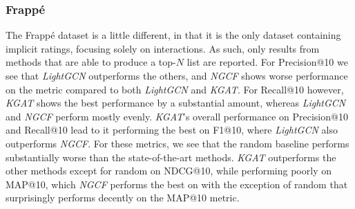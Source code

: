 \subsubsection{Frappé}
The Frappé dataset is a little different, in that it is the only dataset containing implicit ratings, focusing solely on interactions.
As such, only results from methods that are able to produce a top-$N$ list are reported.
For Precision@10 we see that \textit{LightGCN} outperforms the others, and \textit{NGCF} shows worse performance on the metric compared to both \textit{LightGCN} and \textit{KGAT}.
For Recall@10 however, \textit{KGAT} shows the best performance by a substantial amount, whereas \textit{LightGCN} and \textit{NGCF} perform mostly evenly.
\textit{KGAT}'s overall performance on Precision@10 and Recall@10 lead to it performing the best on F1@10, where \textit{LightGCN} also outperforms \textit{NGCF}.
For these metrics, we see that the random baseline performs substantially worse than the state-of-the-art methods.
\textit{KGAT} outperforms the other methods except for random on NDCG@10, while performing poorly on MAP@10, which \textit{NGCF} performs the best on with the exception of random that surprisingly performs decently on the MAP@10 metric.
